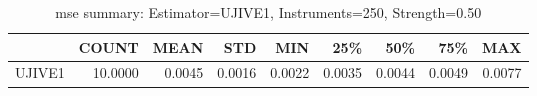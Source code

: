 \begin{table}[ht]
\centering
\caption{mse summary: Estimator=UJIVE1, Instruments=250, Strength=0.50}
\begin{tabular}{lrrrrrrrr}
\toprule
 & COUNT & MEAN & STD & MIN & 25\% & 50\% & 75\% & MAX \\
\midrule
UJIVE1 & 10.0000 & 0.0045 & 0.0016 & 0.0022 & 0.0035 & 0.0044 & 0.0049 & 0.0077 \\
\bottomrule
\end{tabular}
\end{table}
